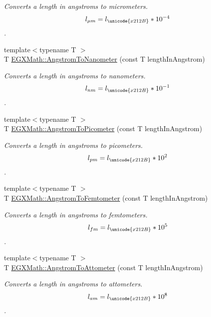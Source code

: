 \begin{DoxyCompactItemize}
\begin{DoxyCompactList}\small\item\em Converts a length in angstroms to micrometers. \[ l_{\mu m}=l_{\unicode{x212B}} * 10^{-4} \]. \end{DoxyCompactList}\item 
{\footnotesize template$<$typename T $>$ }\\T \mbox{\hyperlink{group___e_g_x_math-_conversions-_length_conversions-_non-_s_i-_angstrom-_s_i_ga2b95587436f6db9aa13e6071769058e0}{E\+G\+X\+Math\+::\+Angstrom\+To\+Nanometer}} (const T length\+In\+Angstrom)
\begin{DoxyCompactList}\small\item\em Converts a length in angstroms to nanometers. \[ l_{nm}=l_{\unicode{x212B}} * 10^{-1} \]. \end{DoxyCompactList}\item 
{\footnotesize template$<$typename T $>$ }\\T \mbox{\hyperlink{group___e_g_x_math-_conversions-_length_conversions-_non-_s_i-_angstrom-_s_i_ga59612970b9b51a1a900a76789ffaaf28}{E\+G\+X\+Math\+::\+Angstrom\+To\+Picometer}} (const T length\+In\+Angstrom)
\begin{DoxyCompactList}\small\item\em Converts a length in angstroms to picometers. \[ l_{pm}=l_{\unicode{x212B}} * 10^{2} \]. \end{DoxyCompactList}\item 
{\footnotesize template$<$typename T $>$ }\\T \mbox{\hyperlink{group___e_g_x_math-_conversions-_length_conversions-_non-_s_i-_angstrom-_s_i_gae41b2173230daf03a14a4d917c988ffa}{E\+G\+X\+Math\+::\+Angstrom\+To\+Femtometer}} (const T length\+In\+Angstrom)
\begin{DoxyCompactList}\small\item\em Converts a length in angstroms to femtometers. \[ l_{fm}=l_{\unicode{x212B}} * 10^{5} \]. \end{DoxyCompactList}\item 
{\footnotesize template$<$typename T $>$ }\\T \mbox{\hyperlink{group___e_g_x_math-_conversions-_length_conversions-_non-_s_i-_angstrom-_s_i_ga9bb7edf645cb82492a8792132dbb74e6}{E\+G\+X\+Math\+::\+Angstrom\+To\+Attometer}} (const T length\+In\+Angstrom)
\begin{DoxyCompactList}\small\item\em Converts a length in angstroms to attometers. \[ l_{am}=l_{\unicode{x212B}} * 10^{8} \]. \end{DoxyCompactList}\item 

\end{DoxyCompactItemize}
